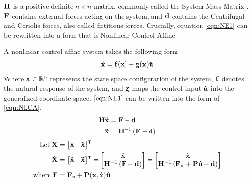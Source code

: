 \noindent ${\mathbf{H}}$ is a positive definite $n \times n$ matrix, commonly called the System Mass Matrix \Cite{riley_hobson_bence_2006}. ${\mathbf{F}}$ contains external forces acting on the system, and ${\mathbf{d}}$ contains the Centrifugal and Coriolis forces, also called fictitious forces. Crucially, equation \ref{eqn:NE1} can be rewritten into a form that is Nonlinear Control Affine. \newline

A nonlinear control-affine system takes the following form
\begin{align} \label{eqn:NLCA}
    {\mathbf{\dot{x}}} = \mathbf{f}({\mathbf{{x}}}) + \mathbf{g}({\mathbf{{x}}}) \mathbf{\hat{u}}
\end{align}
\noindent Where ${\mathbf{{x}}} \in \mathbb{R}^n$ represents the state space configuration of the system, $\mathbf{f}$ denotes the natural response of the system, and $\mathbf{g}$ maps the control input $\mathbf{\hat{u}}$ into the generalized coordinate space. $\ref{eqn:NE1}$ can be written into the form of \ref{eqn:NLCA}.
\begin{align*}
    {\mathbf{H}} {\mathbf{\Ddot{x}}} &= {\mathbf{F}}  - {\mathbf{d}}  \\ \nonumber
    {\mathbf{\Ddot{x}}} &= {\mathbf{H}}^{-1}\left ({\mathbf{F}}  - {\mathbf{d}} \right ) 
\end{align*}
\begin{align*} \nonumber
\text{Let  }  \mathbf{X} &= \begin{bmatrix} {\mathbf{{x}}} & {\mathbf{\dot{x}}} \end{bmatrix}^\intercal \\
    \dot{\mathbf{X}} &= \begin{bmatrix}
     {\mathbf{\dot{x}}} &{\mathbf{\Ddot{x}}}
    \end{bmatrix}^\intercal 
    =
    \begin{bmatrix}
     {\mathbf{\dot{x}}} \\ {\mathbf{H}} ^{-1}\left ({\mathbf{F}}  - {\mathbf{d}} \right ) 
    \end{bmatrix} 
    =
    \begin{bmatrix}
     {\mathbf{\dot{x}}} \\ {\mathbf{H}} ^{-1}\left ({\mathbf{F_n}}  + \mathbf{P}\mathbf{\hat{u}} - {\mathbf{d}} \right )
    \end{bmatrix} \\
    \text{where } {\mathbf{F}} &= {\mathbf{F_n}}  + \mathbf{P}({\mathbf{{x}}}, {\mathbf{\dot{x}}})\mathbf{\hat{u}} 
    \end{align*}

